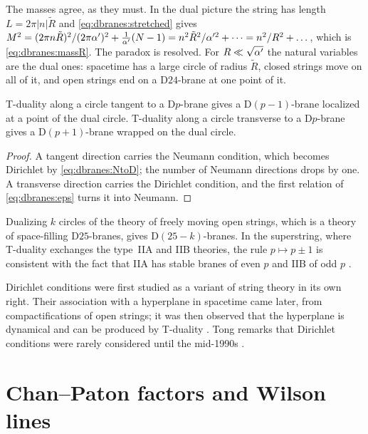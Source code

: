 The masses agree, as they must. In the dual picture the string has length $L=2\pi|n|\tilde R$ and
\eqref{eq:dbranes:stretched} gives
$M^2=(2\pi n\tilde R)^2/(2\pi\alpha')^2+\frac1{\alpha'}(N-1)=n^2\tilde R^2/\alpha'^2+\dots=n^2/R^2+\dots$, which is
\eqref{eq:dbranes:massR}. The paradox is resolved. For $R\ll\sqrt{\alpha'}$ the natural variables are
the dual ones: spacetime has a large circle of radius $\tilde R$, closed strings move on all of
it, and open strings end on a D$24$-brane at one point of it.

\begin{proposition}\label{prop:dbranes:pshift}
T-duality along a circle tangent to a D$p$-brane gives a D$(p-1)$-brane localized at a point of
the dual circle. T-duality along a circle transverse to a D$p$-brane gives a D$(p+1)$-brane
wrapped on the dual circle. \TL\ 
\end{proposition}
\begin{proof}
A tangent direction carries the Neumann condition, which becomes Dirichlet by
\eqref{eq:dbranes:NtoD}; the number of Neumann directions drops by one. A transverse direction
carries the Dirichlet condition, and the first relation of \eqref{eq:dbranes:eps} turns it into
Neumann.
\end{proof}
Dualizing $k$ circles of the theory of freely moving open strings, which is a theory of
space-filling D$25$-branes, gives D$(25-k)$-branes. In the superstring, where T-duality exchanges
the type~IIA and IIB theories, the rule $p\mapsto p\pm1$ is consistent with the fact that IIA has
stable branes of even $p$ and IIB of odd $p$ .

\begin{historybox}
Dirichlet conditions were first studied as a variant of string theory in its own right. Their
association with a hyperplane in spacetime came later, from compactifications of open strings;
it was then observed that the hyperplane is dynamical and can be produced by T-duality
. Tong remarks that Dirichlet conditions were rarely considered
until the mid-1990s .
\end{historybox}

\section{Chan--Paton factors and Wilson lines}\label{sec:dbranes:wilson}

